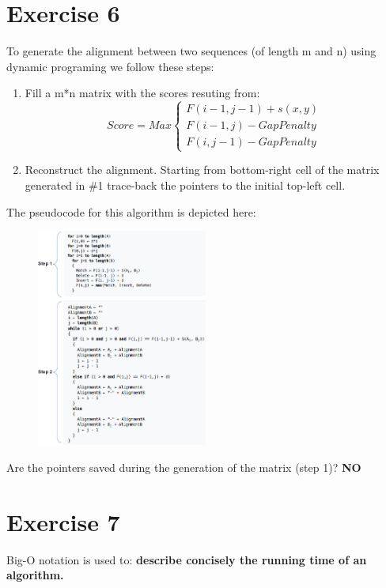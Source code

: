 \section{Exercise 6}
To generate the alignment between two sequences (of length m and n) using dynamic programing we follow these steps:
\begin{enumerate}
\item  Fill a m*n matrix with the scores resuting from: 
$$ Score = Max 
  \begin{cases}
    F(i-1, j-1) + s(x,y)\\ 
    F(i-1, j) - GapPenalty \\
    F(i, j-1) - GapPenalty
  \end{cases}
$$
  
\item  Reconstruct the alignment. Starting from bottom-right cell of the matrix generated in \#1 trace-back the pointers to the initial top-left cell.
\end{enumerate}

The pseudocode for this algorithm is depicted here:
\begin{figure}[htbp]
\centering
\includegraphics[width = 0.5\textwidth]{figs/exam-ex6.png}
\end{figure}

Are the pointers saved during the generation of the matrix (step 1)? \textbf{NO}

\section{Exercise 7}
Big-O notation is used to: \textbf{describe concisely the running time of an algorithm.}

